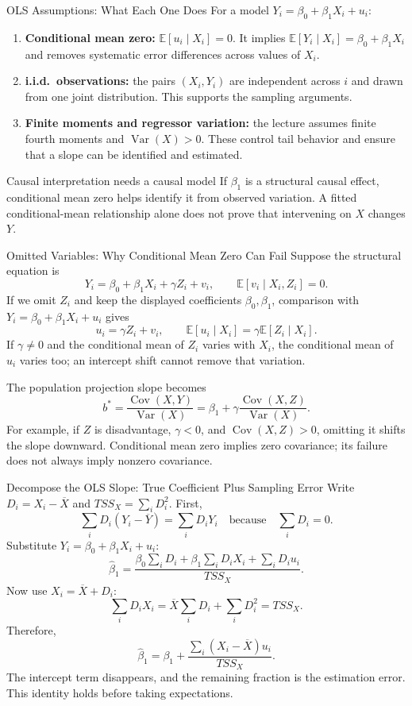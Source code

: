 \documentclass[10pt,aspectratio=169]{beamer}
\newcommand{\E}{\mathbb{E}}
\newcommand{\Var}{\operatorname{Var}}
\newcommand{\Cov}{\operatorname{Cov}}
\begin{document}
\begin{frame}{OLS Assumptions: What Each One Does}
\small
For a model $Y_i=\beta_0+\beta_1X_i+u_i$:
\begin{enumerate}
\item \textbf{Conditional mean zero:} $\E[u_i\mid X_i]=0$.
It implies $\E[Y_i\mid X_i]=\beta_0+\beta_1X_i$ and removes systematic error differences across values of $X_i$.
\item \textbf{i.i.d.\ observations:} the pairs $(X_i,Y_i)$ are independent across $i$ and drawn from one joint distribution.
This supports the sampling arguments.
\item \textbf{Finite moments and regressor variation:} the lecture assumes finite fourth moments and $\Var(X)>0$.
These control tail behavior and ensure that a slope can be identified and estimated.
\end{enumerate}
\begin{block}{Causal interpretation needs a causal model}
If $\beta_1$ is a structural causal effect, conditional mean zero helps identify it from observed variation. A fitted conditional-mean relationship alone does not prove that intervening on $X$ changes $Y$.
\end{block}
\end{frame}

\begin{frame}{Omitted Variables: Why Conditional Mean Zero Can Fail}
\small
Suppose the structural equation is
\[
Y_i=\beta_0+\beta_1X_i+\gamma Z_i+v_i,\qquad \E[v_i\mid X_i,Z_i]=0.
\]
If we omit $Z_i$ and keep the displayed coefficients $\beta_0,\beta_1$, comparison with
$Y_i=\beta_0+\beta_1X_i+u_i$ gives
\[
u_i=\gamma Z_i+v_i,\qquad
\E[u_i\mid X_i]=\gamma\E[Z_i\mid X_i].
\]
If $\gamma\neq0$ and the conditional mean of $Z_i$ varies with $X_i$, the conditional mean of $u_i$ varies too; an intercept shift cannot remove that variation.
\par\medskip
The population projection slope becomes
\[
b^*=\frac{\Cov(X,Y)}{\Var(X)}
=\beta_1+\gamma\frac{\Cov(X,Z)}{\Var(X)}.
\]
For example, if $Z$ is disadvantage, $\gamma<0$, and $\Cov(X,Z)>0$, omitting it shifts the slope downward.
Conditional mean zero implies zero covariance; its failure does not always imply nonzero covariance.
\end{frame}

\begin{frame}{Decompose the OLS Slope: True Coefficient Plus Sampling Error}
\small
Write $D_i=X_i-\overline X$ and $TSS_X=\sum_iD_i^2$. First,
\[
\sum_iD_i(Y_i-\overline Y)=\sum_iD_iY_i
\quad\text{because}\quad \sum_iD_i=0.
\]
Substitute $Y_i=\beta_0+\beta_1X_i+u_i$:
\[
\widehat\beta_1
=\frac{\beta_0\sum_iD_i+\beta_1\sum_iD_iX_i+\sum_iD_i u_i}{TSS_X}.
\]
Now use $X_i=\overline X+D_i$:
\[
\sum_iD_iX_i=\overline X\sum_iD_i+\sum_iD_i^2=TSS_X.
\]
Therefore,
\[
\boxed{\widehat\beta_1=\beta_1+\frac{\sum_i(X_i-\overline X)u_i}{TSS_X}}.
\]
The intercept term disappears, and the remaining fraction is the estimation error. This identity holds before taking expectations.
\end{frame}
\end{document}
